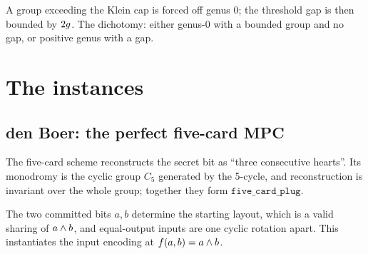 \begin{theorem}
  \label{thm:rigidity_laws}
  \rocqok
  A group exceeding the Klein cap is forced off genus 0; the threshold gap is
  then bounded by $2g$. The dichotomy: either genus-0 with a bounded group
  and no gap, or positive genus with a gap.
\end{theorem}

\part{The instances}

\chapter{den Boer: the perfect five-card MPC}

\begin{definition}
  \label{def:five_card}
  \rocqok
  The five-card scheme reconstructs the secret bit as ``three consecutive
  hearts''. Its monodromy is the cyclic group $C_5$ generated by the 5-cycle,
  and reconstruction is invariant over the whole group; together they form
  $\mathtt{five\_card\_plug}$.
\end{definition}

\begin{definition}
  \label{def:den_boer_encoding}
  \rocqok
  The two committed bits $a,b$ determine the starting layout, which is a valid
  sharing of $a\wedge b$, and equal-output inputs are one cyclic rotation apart.
  This instantiates the input encoding at $f(a,b)=a\wedge b$.
\end{definition}

